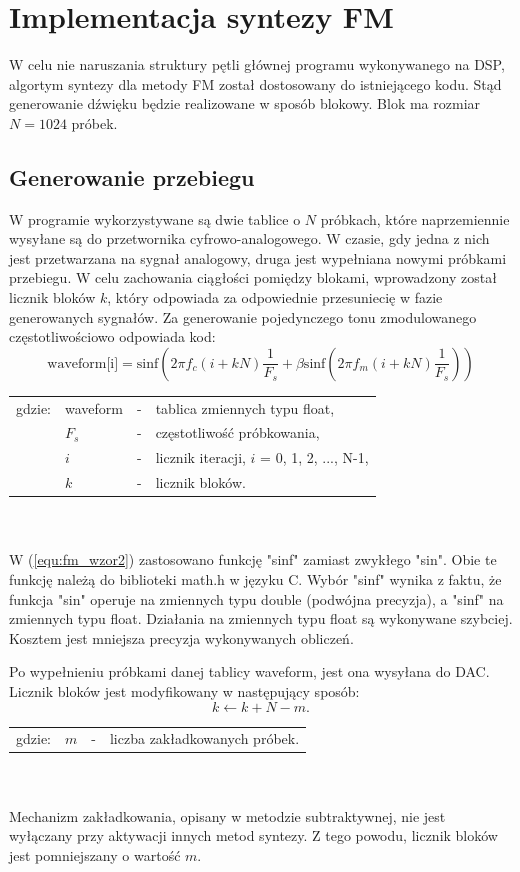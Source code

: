 \section{Implementacja syntezy FM}
W celu nie naruszania struktury pętli głównej programu wykonywanego na DSP, algortym syntezy dla metody FM został dostosowany do istniejącego kodu. Stąd generowanie dźwięku będzie realizowane w sposób blokowy. Blok ma rozmiar $N = 1024$ próbek. 
\subsection{Generowanie przebiegu}
W programie wykorzystywane są dwie tablice o $N$ próbkach, które naprzemiennie wysyłane są do przetwornika cyfrowo-analogowego. W czasie, gdy jedna z nich jest przetwarzana na sygnał analogowy, druga jest wypełniana nowymi próbkami przebiegu. W celu zachowania ciągłości pomiędzy blokami, wprowadzony został licznik bloków $k$, który odpowiada za odpowiednie przesuniecię w fazie generowanych sygnałów. Za generowanie pojedynczego tonu zmodulowanego częstotliwościowo odpowiada kod:
\begin{equation} \label{equ:fm_wzor2}
\text{waveform[i]} = \text{sinf}(2\pi f_c(i+kN)\frac{1}{F_s} + \beta \text{sinf}(2 \pi f_m(i+kN)\frac{1}{F_s}))
\end{equation}
\begin{tabular}{ l l l l}
	gdzie: & waveform &  - & tablica zmiennych typu float, \\
	&	$F_s$ & - & częstotliwość próbkowania,\\
	&	$i$ & - &  licznik iteracji, $i$ = 0, 1, 2, ..., N-1,\\
	&	$k$ & - &  licznik bloków.\\
\end{tabular} \\ \\
W (\ref{equ:fm_wzor2}) zastosowano funkcję "sinf" zamiast zwykłego "sin". Obie te funkcję należą do biblioteki math.h w języku C. Wybór "sinf" wynika z faktu, że funkcja "sin" operuje na zmiennych typu double (podwójna precyzja), a "sinf" na zmiennych typu float. Działania na zmiennych typu float są wykonywane szybciej. Kosztem jest mniejsza precyzja wykonywanych obliczeń.

Po wypełnieniu próbkami danej tablicy waveform, jest ona wysyłana do DAC. Licznik bloków jest modyfikowany w następujący sposób:
\begin{equation} \label{equ:fm_wzor3}
k \gets k + N - m.
\end{equation}
\begin{tabular}{ l l l l}
	gdzie: & $m$  &  - & liczba zakładkowanych próbek. \\
\end{tabular} \\ \\
Mechanizm zakładkowania, opisany w metodzie subtraktywnej, nie jest wyłączany przy aktywacji innych metod syntezy. Z tego powodu, licznik bloków jest pomniejszany o wartość $m$.
